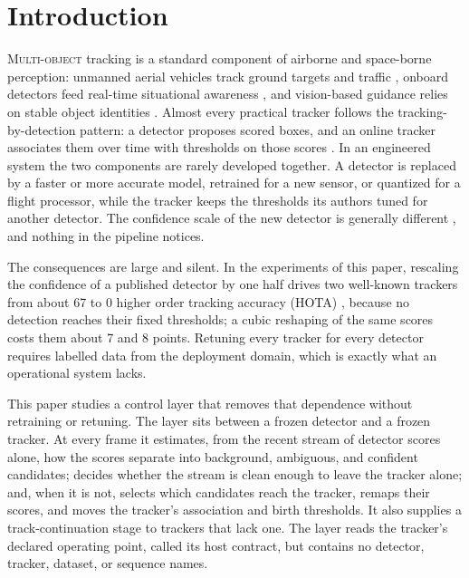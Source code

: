 \documentclass[journal]{new-aiaa}
\begin{document}
\section{Introduction}
\lettrine{M}{ulti-object} tracking is a standard component of airborne and space-borne perception: unmanned aerial vehicles track ground targets and traffic \cite{miller2015multitarget,desai2017uavfeature}, onboard detectors feed real-time situational awareness \cite{lu2024uavdetection,choi2022docking}, and vision-based guidance relies on stable object identities \cite{parsons2019refueling}. Almost every practical tracker follows the tracking-by-detection pattern: a detector proposes scored boxes, and an online tracker associates them over time with thresholds on those scores \cite{bewley2016sort,zhang2022bytetrack,cao2023ocsort}. In an engineered system the two components are rarely developed together. A detector is replaced by a faster or more accurate model, retrained for a new sensor, or quantized for a flight processor, while the tracker keeps the thresholds its authors tuned for another detector. The confidence scale of the new detector is generally different \cite{kuppers2020detcalib}, and nothing in the pipeline notices.

The consequences are large and silent. In the experiments of this paper, rescaling the confidence of a published detector by one half drives two well-known trackers from about 67 to 0 higher order tracking accuracy (HOTA) \cite{luiten2021hota}, because no detection reaches their fixed thresholds; a cubic reshaping of the same scores costs them about 7 and 8 points. Retuning every tracker for every detector requires labelled data from the deployment domain, which is exactly what an operational system lacks.

This paper studies a control layer that removes that dependence without retraining or retuning. The layer sits between a frozen detector and a frozen tracker. At every frame it estimates, from the recent stream of detector scores alone, how the scores separate into background, ambiguous, and confident candidates; decides whether the stream is clean enough to leave the tracker alone; and, when it is not, selects which candidates reach the tracker, remaps their scores, and moves the tracker's association and birth thresholds. It also supplies a track-continuation stage to trackers that lack one. The layer reads the tracker's declared operating point, called its host contract, but contains no detector, tracker, dataset, or sequence names.
\end{document}
